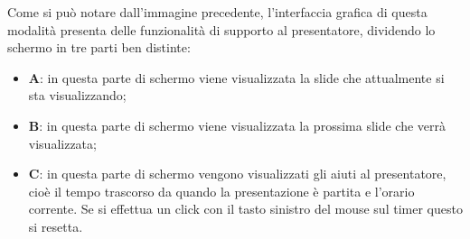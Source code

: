 \noindent Come si può notare dall'immagine precedente, l'interfaccia grafica di questa modalità presenta delle funzionalità di supporto al presentatore, dividendo lo schermo in tre parti ben distinte:
\begin{itemize}
	\item \textbf{A}: in questa parte di schermo viene visualizzata la slide che attualmente si sta visualizzando;
	\item \textbf{B}: in questa parte di schermo viene visualizzata la prossima slide che verrà visualizzata;
	\item \textbf{C}: in questa parte di schermo vengono visualizzati gli aiuti al presentatore, cioè il tempo trascorso da quando la presentazione è partita e l'orario corrente. Se si effettua un click con il tasto sinistro del mouse sul timer questo si resetta.
\end{itemize}

